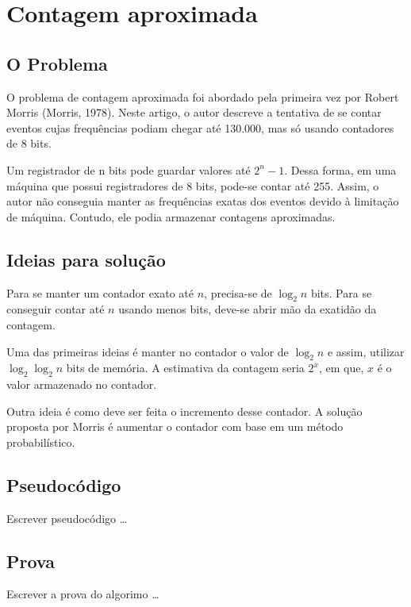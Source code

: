 \chapter{Contagem aproximada}
\label{chap:morris}

\section{O Problema}

O problema de contagem aproximada foi abordado pela primeira vez por Robert  Morris (Morris, 1978). 
Neste artigo, o autor descreve a tentativa de se contar eventos cujas frequências podiam chegar até 130.000, mas só usando contadores de 8 bits.

Um registrador de n bits pode guardar valores até $2^n-1$. Dessa forma, em uma máquina que possui registradores de 8 bits, pode-se contar até 255.
Assim, o autor não conseguia manter as frequências exatas dos eventos devido à limitação de máquina. 
Contudo, ele podia armazenar contagens aproximadas.

\section{Ideias para solução}

Para se manter um contador exato até $n$, precisa-se de $\log_2 n$ bits. Para se conseguir contar até $n$ usando menos bits, 
deve-se abrir mão da exatidão da contagem. 

Uma das primeiras ideias é manter no contador o valor de $\log_2 n$ e assim, utilizar $\log_2 \log_2 n$ bits de memória. 
A estimativa da contagem seria $2^x$, em que, $x$ é o valor armazenado no contador.

Outra ideia é como deve ser feita o incremento desse contador. 
A solução proposta por Morris é aumentar o contador com base em um método probabilístico. 



\section{Pseudocódigo}

Escrever pseudocódigo \dots

\section{Prova}

Escrever a prova do algorimo \dots
